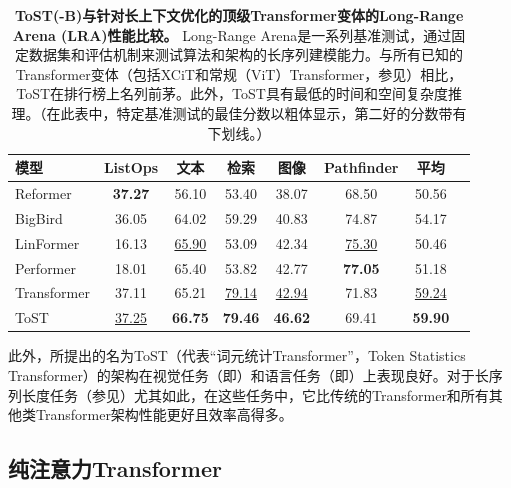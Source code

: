 \documentclass[../../book-main_zh.tex]{subfiles}
\begin{document}
\begin{table}
\centering

\begin{tabular}{@{}lccccccc@{}}
\toprule
模型        & ListOps  & 文本     & 检索 & 图像    &
Pathfinder & 平均      \\
\midrule
\midrule
Reformer              & \textbf{37.27} & 56.10             & 53.40
& 38.07             & 68.50               & 50.56             \\
BigBird               & 36.05             & 64.02             & 59.29
& 40.83             & 74.87                & 54.17             \\
LinFormer         & 16.13             & \underline{65.90} & 53.09
& 42.34             & \underline{75.30}               & 50.46             \\
Performer             & 18.01             & 65.40             & 53.82
& 42.77             & \textbf{77.05}                & 51.18             \\
Transformer           & 37.11             & 65.21             &
\underline{79.14}              & \underline{42.94}             &
71.83              & \underline{59.24}            \\
ToST & \underline{37.25}    & \textbf{66.75}    & \textbf{79.46}
& \textbf{46.62}    &    69.41      &     \textbf{59.90}\\

\bottomrule
\end{tabular}%
\caption{\small \textbf{ToST(-B)与针对长上下文优化的顶级Transformer变体的Long-Range Arena (LRA)性能比较。} Long-Range Arena是一系列基准测试，通过固定数据集和评估机制来测试算法和架构的长序列建模能力。与所有已知的Transformer变体（包括XCiT和常规（ViT）Transformer，参见）相比，ToST在排行榜上名列前茅。此外，ToST具有最低的时间和空间复杂度推理。（在此表中，特定基准测试的最佳分数以粗体显示，第二好的分数带有下划线。）}
\label{tab:tost_lra_results}
\end{table}

此外，所提出的名为ToST（代表“词元统计Transformer”，Token
Statistics Transformer）的架构在视觉任务（即）和语言任务（即）上表现良好。对于长序列长度任务（参见）尤其如此，在这些任务中，它比传统的Transformer和所有其他类Transformer架构性能更好且效率高得多。

\subsection{纯注意力Transformer} \label{sub:aot_experiments}
\end{document}
